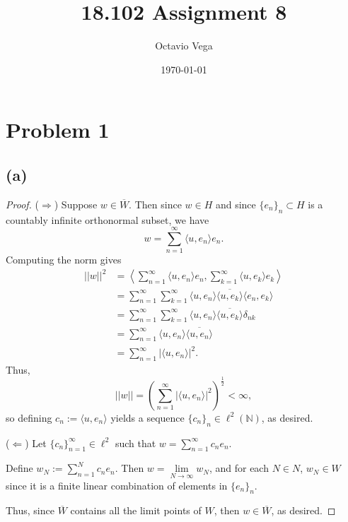\documentclass{article}
\title{18.102 Assignment 8}
\author{Octavio Vega}
\date\today
\newcommand{\N}{\mathbb{N}} %
\begin{document}
\maketitle
	
\section*{Problem 1}
\subsection*{(a)}
\begin{proof}
	($\Rightarrow$) Suppose $w \in \overline{W}$. Then since $w \in H$ and since $\{e_n\}_n \subset H$ is a countably infinite orthonormal subset, we have
	\begin{equation}
		w = \sum_{n=1}^{\infty} \langle u, e_n \rangle e_n.
	\end{equation}
	Computing the norm gives
	\begin{align}
		||w||^2 &= \left\langle \sum_{n=1}^{\infty} \langle u, e_n \rangle e_n, \sum_{k=1}^{\infty} \langle u, e_k \rangle e_k \right \rangle \\
		&= \sum_{n=1}^{\infty}\sum_{k=1}^{\infty} \langle u, e_n \rangle \overline{\langle u, e_k \rangle} \langle e_n, e_k \rangle \\
		&= \sum_{n=1}^{\infty}\sum_{k=1}^{\infty} \langle u, e_n \rangle \overline{\langle u, e_k \rangle} \delta_{nk} \\
		&= \sum_{n=1}^{\infty}\langle u, e_n \rangle \overline{\langle u, e_n \rangle} \\
		&= \sum_{n=1}^{\infty} |\langle u, e_n \rangle|^2.
	\end{align}
	Thus, 
	\begin{equation}
		||w|| = \left(\sum_{n=1}^{\infty}|\langle u, e_n \rangle|^2\right)^\frac{1}{2} < \infty,
	\end{equation}
	so defining $c_n := \langle u, e_n \rangle$ yields a sequence $\{c_n\}_n \in \ell^2 (\N)$, as desired.
	
	($\Leftarrow$) Let $\{c_n\}_{n=1}^{\infty} \in \ell^{2}$ such that $w = \sum_{n=1}^{\infty} c_n e_n$. 
	
	Define $w_N := \sum_{n=1}^N c_n e_n$. Then $w = \lim\limits_{N \to \infty} w_N$, and for each $N \in N$, $w_N \in W$ since it is a finite linear combination of elements in $\{e_n\}_n$.
	
	Thus, since $\overline{W}$ contains all the limit points of $W$, then $w \in \overline{W}$, as desired.
\end{proof}
\end{document}
